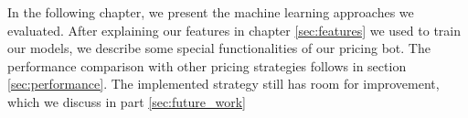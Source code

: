 In the following chapter, we present the machine learning approaches we evaluated. After explaining our features in chapter \ref{sec:features} we used to train our models, we describe some special functionalities of our pricing bot. The performance comparison with other pricing strategies follows in section \ref{sec:performance}. The implemented strategy still has room for improvement, which we discuss in part \ref{sec:future_work}
